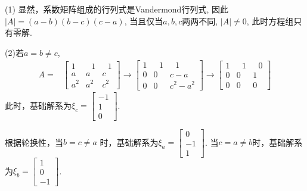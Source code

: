  (1) 显然，系数矩阵组成的行列式是Vandermond行列式, 因此$|A|=(a-b)(b-c)(c-a)$, 当且仅当$a,b,c$两两不同, $|A|≠0$, 此时方程组只有零解.

(2)若$a=b\not=c$,
\begin{displaymath}
\begin{aligned}
A=&\begin{bmatrix}1&\ \ \ 1&\ \ \ 1\\a&a&c\\a^2&a^2&c^2 \end{bmatrix}\rightarrow
\begin{bmatrix}1&\ \ \ 1&\ \ \ 1\\0&0&c-a\\0&0&c^2-a^2 \end{bmatrix}\rightarrow
\begin{bmatrix}1&\ \ \ 1&\ \ \ 0\\0&0&1\\0&0&0 \end{bmatrix}
\end{aligned} \end{displaymath}
此时，基础解系为$\xi_c=\begin{bmatrix}-1\\1\\0\end{bmatrix}$.

根据轮换性，当$b=c\not=a$ 时，基础解系为$\xi_a=\begin{bmatrix}0\\-1\\1\end{bmatrix}$. 当$c=a\not=b$时，基础解系为$\xi_b=\begin{bmatrix}1\\0\\-1\end{bmatrix}$.

